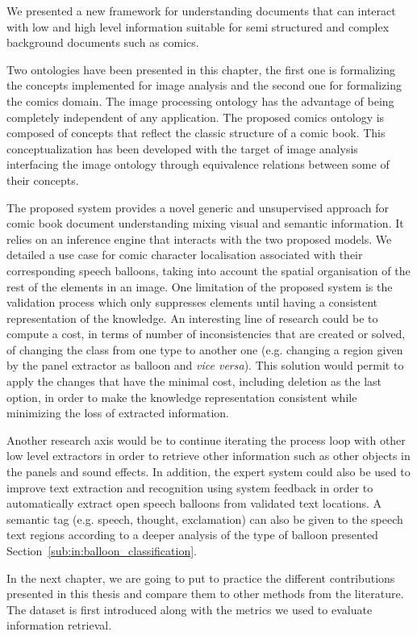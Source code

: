 We presented a new framework for understanding documents that can interact with low and high level information suitable for semi structured and complex background documents such as comics.

Two ontologies have been presented in this chapter, the first one is formalizing the concepts implemented for image analysis and the second one for formalizing the comics domain.
The image processing ontology has the advantage of being completely independent of any application.
The proposed comics ontology is composed of concepts that reflect the classic structure of a comic book.
This conceptualization has been developed with the target of image analysis interfacing the image ontology through equivalence relations between some of their concepts.

The proposed system provides a novel generic and unsupervised approach for comic book document understanding mixing visual and semantic information.
It relies on an inference engine that interacts with the two proposed models.
We detailed a use case for comic character localisation associated with their corresponding speech balloons, taking into account the spatial organisation of the rest of the elements in an image.
One limitation of the proposed system is the validation process which only suppresses elements until having a consistent representation of the knowledge.
An interesting line of research could be to compute a cost, in terms of number of inconsistencies that are created or solved, of changing the class from one type to another one (e.g. changing a region given by the panel extractor as balloon and \emph{vice versa}).
This solution would permit to apply the changes that have the minimal cost, including deletion as the last option, in order to make the knowledge representation consistent while minimizing the loss of extracted information.

Another research axis would be to continue iterating the process loop with other low level extractors in order to retrieve other information such as other objects in the panels and sound effects.
In addition, the expert system could also be used to improve text extraction and recognition using system feedback in order to automatically extract open speech balloons from validated text locations.
A semantic tag (e.g. speech, thought, exclamation) can also be given to the speech text regions according to a deeper analysis of the type of balloon presented Section~\ref{sub:in:balloon_classification}.

In the next chapter, we are going to put to practice the different contributions presented in this thesis and compare them to other methods from the literature.
The dataset is first introduced along with the metrics we used to evaluate information retrieval. 
